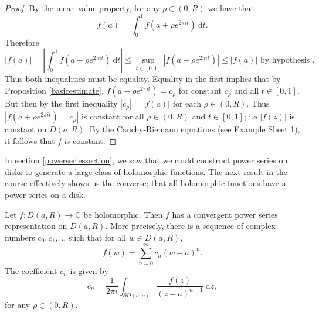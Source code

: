 \documentclass[egregdoesnotlikesansseriftitles,a4paper]{scrartcl}
\begin{document}
\begin{proof}
      By the mean value property, for any $\rho \in \left(0,R\right)$ we have that \[
      f \left(a\right)= \int_{0}^{1} f \left(a+\rho e^{2 \pi  it }\right) \ \mathrm{d}t 
      .\] Therefore \[
      \left|f \left(a\right)\right|=\left|\int_{0}^{1} f \left(a+\rho e^{2 \pi  it }\right) \ \mathrm{d}t \right| \leq \sup_{t\in [0,1]}\left|f \left(a+\rho e^{2 \pi it }\right)\right|\leq \left|f \left(a\right)\right| \text{ by hypothesis }
     .\] Thus both inequalities must be equality. Equality in the first implies that by Proposition \ref{basicestimate}, $f \left(a+\rho e^{2\pi i t}\right)=c_{\rho }$ for constant $c_{\rho }$ and all $t \in [0,1]$. But then by the first inequality $\left|c_{\rho }\right|=\left|f \left(a\right)\right|$ for each $\rho \in \left(0,R\right)$. Thus $\left|f \left(a+\rho e^{2\pi i t}\right)=c_{\rho }\right|$ is constant for all $\rho \in \left(0,R\right)$ and $t \in [0,1]$; i.e $\left|f \left(z\right)\right|$ is constant on $D \left(a,R\right)$. By the Cauchy-Riemann equations (see Example Sheet 1), it follows that $f$ is constant.
\end{proof}
In section \ref{powerseriessection}, we saw that we could construct power series on disks to generate a large class of holomorphic functions. The next result in the course effectively shows us the converse; that all holomorphic functions have a power series on a disk. 
\begin{theorem}
      Let $f: D \left(a,R\right) \rightarrow \mathbb{C}$ be holomorphic. Then $f$ has a convergent power series representation on $D \left(a,R\right)$. More precisely, there is a sequence of complex numbers $c_0 , c_1 , \ldots$ such that for all $w \in D \left(a,R\right)$, \[
      f \left(w\right)=\sum_{n=0}^{\infty}c_{n} \left(w-a\right)^{n}
      .\] The coefficient $c_{n}$ is given by \[
      c_{n}=\frac{1}{2\pi i}\int_{\partial D \left(a,\rho \right)}^{} \frac{f \left(z\right)}{\left(z-a\right)^{n+1}} \ \mathrm{d}z 
      ,\] for any $\rho \in \left(0,R\right)$.
\end{theorem}
\end{document}
